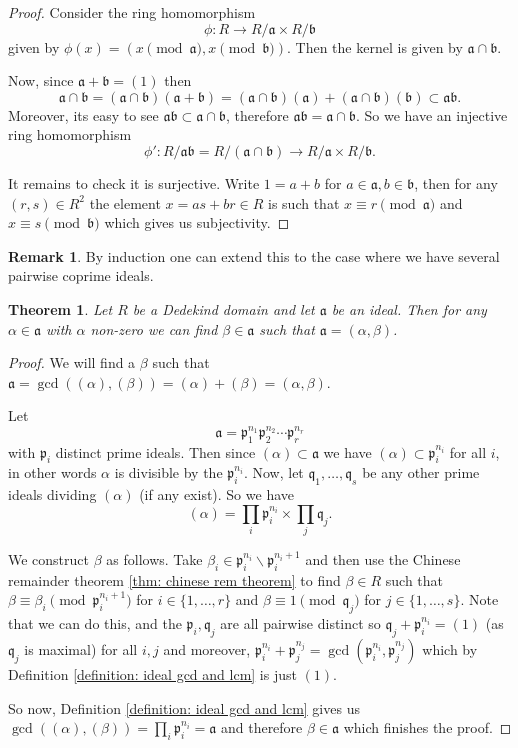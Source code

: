 \documentclass[11pt,a4paper]{report}
\theoremstyle{plain}
\newtheorem{theorem}[subsection]{Theorem}
\theoremstyle{definition}
\theoremstyle{definition}
\newtheorem{rmrk}[subsection]{Remark}
\def\gothb{\mathfrak{b}}
\def\gothp{\mathfrak{p}}
\def\gothq{\mathfrak{q}}
\def \a{\alpha}
\def\gotha{\mathfrak{a}}
\def \lra{\longrightarrow}
\begin{document}
	\begin{proof}
		Consider the ring homomorphism \[\phi: R \to R/\gotha \times R/\gothb\] given by $\phi(x)=(x \pmod \gotha, x \pmod \gothb)$. Then the kernel is given by $\gotha \cap \gothb$.
		
		Now, since $\gotha+\gothb=(1)$ then \[\gotha \cap \gothb =(\gotha \cap \gothb)(\gotha+\gothb)=(\gotha \cap \gothb)(\gotha)+(\gotha \cap \gothb)(\gothb) \subset \gotha \gothb.\] Moreover, its easy to see $\gotha\gothb \subset \gotha \cap \gothb$, therefore $\gotha\gothb=\gotha \cap \gothb$. So we have an injective ring homomorphism \[\phi':R/ \gotha\gothb=R/(\gotha\cap \gothb) \lra R/\gotha \times R/\gothb.\]
		
		It remains to check it is surjective. Write $1=a+b$ for $a \in \gotha,b \in \gothb$, then for any $(r,s) \in R^2$ the element $x=as+br \in R$ is such that $x \equiv r \pmod \gotha$ and $x \equiv s \pmod \gothb$ which gives us subjectivity.
	\end{proof}
	
	\begin{rmrk}
		By induction one can extend this to the case where we have several pairwise coprime ideals.
	\end{rmrk}
	
	\begin{theorem}
		Let $R$ be a Dedekind domain and let $\gotha$ be an ideal. Then for any $\a \in \gotha$ with $\a$ non-zero we can find $\beta \in \gotha$ such that $\gotha=(\a,\beta)$.
	\end{theorem}
	
	
	\begin{proof}
		We will find a $\beta$ such that $\gotha=\gcd((\a),(\beta))=(\a)+(\beta)=(\a,\beta)$.
		
		Let \[\gotha=\gothp_1^{n_1}\gothp_2^{n_2}\cdots\gothp_r^{n_r}\] with $\gothp_i$ distinct prime ideals. Then since $(\a) \subset \gotha$ we have $(\a) \subset \gothp_i^{n_i}$ for all $i$, in other words $\a$ is divisible by the $\gothp_i^{n_i}$. Now, let $\gothq_1,\dots,\gothq_s$ be any other prime ideals dividing $(\a)$ (if any exist). So we have \[(\a)=\prod_i \gothp_i^{n_i} \times \prod_j \gothq_j.\]
		
		We construct $\beta$ as follows. Take $\beta_i \in \gothp_i^{n_i} \backslash \gothp_i^{n_i+1}$ and then use the Chinese remainder theorem \ref{thm: chinese rem theorem} to find $\beta \in R$ such that $\beta \equiv \beta_i \pmod {\gothp_i^{n_i+1}}$ for $i \in \{1,\dots,r\}$ and $\beta \equiv 1 \pmod {\gothq_j}$ for $j \in \{1,\dots,s\}$. Note that we can do this, and the $\gothp_i,\gothq_j$ are all pairwise distinct so $\gothq_j+\gothp_i^{n_i}=(1)$ (as $\gothq_j$ is maximal) for all $i,j$ and moreover, $\gothp_i^{n_i}+\gothp_j^{n_j}=\gcd(\gothp_i^{n_i},\gothp_j^{n_j})$ which by Definition \ref{definition: ideal gcd and lcm} is just $(1)$.
		
		So now,  Definition \ref{definition: ideal gcd and lcm} gives us $\gcd((\a),(\beta))=\prod_i \gothp_i^{n_i}=\gotha$ and therefore $\beta \in \gotha$ which finishes the proof.
		
		
	\end{proof}
	
\end{document}
